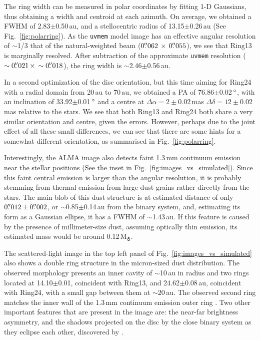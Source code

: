 \documentclass[usenatbib,times]{mnras}
\begin{document}
The ring width can be measured in polar coordinates by fitting 1-D Gaussians, thus obtaining a width and centroid at each azimuth. On average, we obtained a FWHM of 2.83$\pm$0.50\,au, and a stellocentric radius of 13.15$\pm$0.26\,au (See Fig.~\ref{fig:polarring}). As the {\tt uvmem} model image has an effective angular resolution of $\sim$1/3 that of the natural-weighted beam ($0\hbox{$.\!\!^{\prime\prime}$}062 \,\times \, 0\hbox{$.\!\!^{\prime\prime}$}055$), we see that Ring13 is marginally resolved. After subtraction of the approximate {\tt uvmem} resolution ($\sim0\hbox{$.\!\!^{\prime\prime}$}021 \,\times \,\sim0\hbox{$.\!\!^{\prime\prime}$}018$), the ring width is $\sim$2.46$\pm$0.56\,au.

In a second optimization of the disc orientation, but this time aiming for Ring24 with a radial domain from 20\,au to 70\,au, we obtained a PA of 76.86$\pm$0.02\,$\hbox{$^\circ$}$, with an inclination of 33.92$\pm$0.01\,$\hbox{$^\circ$}$ and a centre at $\Delta \alpha = 2\pm0.02$\,mas $\Delta \delta = 12\pm0.02$\,mas relative to the stars. We see that both Ring13 and Ring24 both share a very similar orientation and centre, given the errors. However, perhaps due to the joint effect of all these small differences, we can see that there are some hints for a somewhat different orientation, as summarised in Fig.~\ref{fig:polarring}.

Interestingly, the ALMA image also detects faint 1.3\,mm continuum emission near the stellar positions (See the inset in Fig.~\ref{fig:images_vs_simulated}). Since this faint central emission is larger than the angular resolution, it is probably stemming from thermal emission from  large dust grains rather directly from the stars. The main blob of this dust structure is at estimated distance of only $0\hbox{$.\!\!^{\prime\prime}$}012\pm0\hbox{$.\!\!^{\prime\prime}$}002$, or $\sim$0.85$\pm$0.14\,au from the binary system, and, estimating its form as a Gaussian ellipse, it has a FWHM of $\sim$1.43\,au. If this feature is caused by the presence of millimeter-size dust, assuming optically thin emission, its estimated mass would be around 0.12\,M$_{\earth}$. %

The scattered-light image in the top left panel of Fig.~\ref{fig:images_vs_simulated} also shows a double ring structure in the micron-sized dust distribution. The observed morphology presents an inner cavity of $\sim$10\,au in radius and two rings located at 14.10$\pm$0.01, coincident with Ring13, and 24.62$\pm$0.08\,au, coincident with Ring24, with a small gap between them at $\sim$20\,au. The observed second ring matches the inner wall of the 1.3\,mm continuum emission outer ring \citep{Ru_z_Rodr_guez_2019}. Two other important features that are present in the image are: the near-far brightness asymmetry, and the shadows projected on the disc by the close binary system as they eclipse each other, discovered by \citet{dOrazi}.
\end{document}

